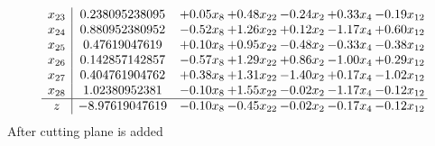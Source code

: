 \documentclass[8pt]{article}
\begin{document}
\[\begin{array}{c| c c@{\hskip 2pt} c@{\hskip 2pt} c@{\hskip 2pt} c@{\hskip 2pt} c@{\hskip 2pt} }
 x_{23}   &  0.238095238095 & +  0.05 x_{8} & +  0.48 x_{22} & -0.24 x_{2} & +  0.33 x_{4} & -0.19 x_{12}\\
 x_{24}   &  0.880952380952 & -0.52 x_{8} & +  1.26 x_{22} & +  0.12 x_{2} & -1.17 x_{4} & +  0.60 x_{12}\\
 x_{25}   &  0.47619047619 & +  0.10 x_{8} & +  0.95 x_{22} & -0.48 x_{2} & -0.33 x_{4} & -0.38 x_{12}\\
 x_{26}   &  0.142857142857 & -0.57 x_{8} & +  1.29 x_{22} & +  0.86 x_{2} & -1.00 x_{4} & +  0.29 x_{12}\\
 x_{27}   &  0.404761904762 & +  0.38 x_{8} & +  1.31 x_{22} & -1.40 x_{2} & +  0.17 x_{4} & -1.02 x_{12}\\
 x_{28}   &  1.02380952381 & -0.10 x_{8} & +  1.55 x_{22} & -0.02 x_{2} & -1.17 x_{4} & -0.12 x_{12}\\
\hline
z    &  -8.97619047619 & -0.10 x_{8} & -0.45 x_{22} & -0.02 x_{2} & -0.17 x_{4} & -0.12 x_{12}\\
\end{array}\]
 After cutting plane is added 
\end{document}

